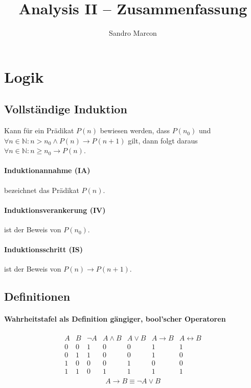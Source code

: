 \documentclass[a4paper, 9pt, DIV=24]{scrartcl}
\title{Analysis II -- Zusammenfassung}
\author{Sandro Marcon}
\newcommand{\N}{\mathbb{N}}
\begin{document}
\pagestyle{fancy}
\fancyhf{}

\begin{twocolumn}
\tableofcontents
\end{twocolumn}

\clearpage

\section{Logik}

\subsection{Vollständige Induktion}
Kann für ein Prädikat $P(n)$ bewiesen werden, dass $P(n_0)$ und $\forall n\in\N: n > n_0 \wedge P(n) \rightarrow P(n+1)$ gilt,
dann folgt daraus $\forall n\in\N: n \geq n_0 \rightarrow P(n)$.
\paragraph{Induktionannahme (IA)} bezeichnet das Prädikat $P(n)$.
\paragraph{Induktionsverankerung (IV)} ist der Beweis von $P(n_0)$.
\paragraph{Induktionsschritt (IS)} ist der Beweis von $P(n) \rightarrow P(n+1)$.

\subsection{Definitionen}
\paragraph{Wahrheitstafel als Definition gängiger, bool'scher Operatoren}
\[
\begin{array}{ccccccc}
A&B&\neg A&A \wedge B&A \vee B & A \rightarrow B & A \leftrightarrow B \\\hline
0&0&1&0&0&1&1\\\hline
0&1&1&0&0&1&0\\\hline
1&0&0&0&1&0&0\\\hline
1&1&0&1&1&1&1\\
\end{array}
\]
$$ A \rightarrow B \equiv \neg A \vee B$$
\end{document}
